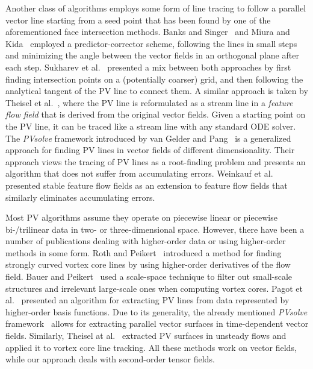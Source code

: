 %
Another class of algorithms employs some form of line tracing to follow a
parallel vector line starting from a seed point that has been found by one of
the aforementioned face intersection methods.
%
Banks and Singer~\cite{Banks1995} and Miura and Kida~\cite{Miura1997} employed a
predictor-corrector scheme, following the lines in small steps and minimizing
the angle between the vector fields in an orthogonal plane after each step.
%
Sukharev et al.~\cite{Sukharev2006} presented a mix between both approaches by
first finding intersection points on a (potentially coarser) grid, and then
following the analytical tangent of the \ac{PV} line to connect them.
%
A similar approach is taken by Theisel et al.~\cite{Theisel2003a}, where the
\ac{PV} line is reformulated as a stream line in a {\em feature flow field} that is
derived from the original vector fields.
%
Given a starting point on the \ac{PV} line, it can be traced like a stream line with
any standard ODE solver.
%
The \emph{PVsolve} framework introduced by van Gelder and Pang~\cite{Gelder2009}
is a generalized approach for finding \ac{PV} lines in vector fields of different
dimensionality.
%
Their approach views the tracing of \ac{PV} lines as a root-finding problem and
presents an algorithm that does not suffer from accumulating errors.
%
Weinkauf et al.~\cite{Weinkauf2011} presented stable feature flow fields as an
extension to feature flow fields that similarly eliminates accumulating errors.
%

%
Most \ac{PV} algorithms assume they operate on piecewise linear or piecewise
bi-/trilinear data in two- or three-dimensional space.
%
However, there have been a number of publications dealing with higher-order data
or using higher-order methods in some form.
%
Roth and Peikert~\cite{Roth1998} introduced a method for finding strongly curved
vortex core lines by using higher-order derivatives of the flow field.
%
Bauer and Peikert~\cite{Bauer2002} used a scale-space technique to filter out
small-scale structures and irrelevant large-scale ones when computing vortex
cores.
%
Pagot et al.~\cite{Pagot2011} presented an algorithm for extracting \ac{PV} lines
from data represented by higher-order basis functions.
%
Due to its generality, the already mentioned \emph{PVsolve}
framework~\cite{Gelder2009} allows for extracting parallel vector surfaces in
time-dependent vector fields.
%
Similarly, Theisel at al.~\cite{Theisel2005} extracted \ac{PV} surfaces in unsteady
flows and applied it to vortex core line tracking.
%
All these methods work on vector fields, while our approach deals with
second-order tensor fields.
%

